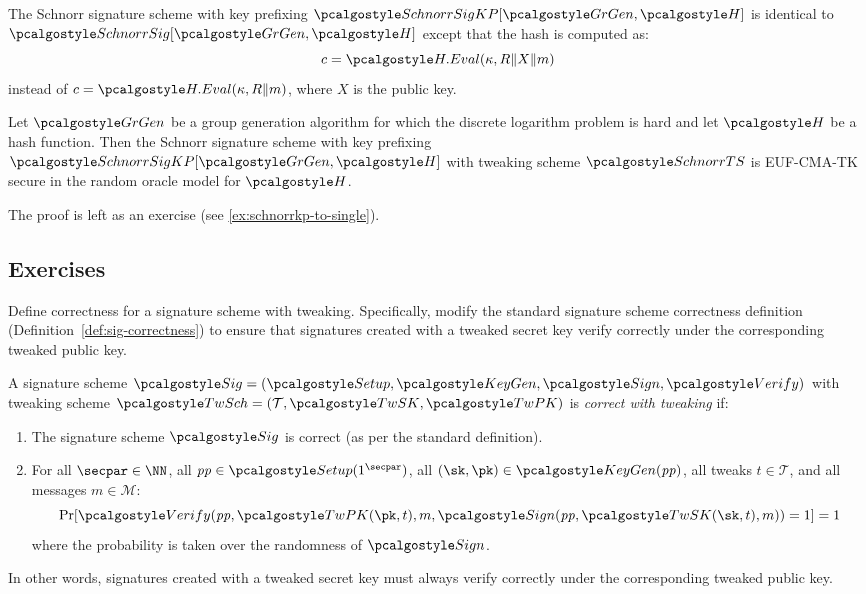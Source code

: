 \begin{definition}\label{def:schnorr-kp}
  The Schnorr signature scheme with key prefixing $\algo{SchnorrSigKP}[\grgen, \algo{H}]$ is identical to $\algo{SchnorrSig}[\grgen, \algo{H}]$ except that the hash is computed as:
  \[
    c = \algo{H.Eval}(\kappa, R \| X \| m)
  \]
  instead of $c = \algo{H.Eval}(\kappa, R \| m)$, where $X$ is the public key.
\end{definition}

\begin{theorem}\label{thm:schnorrkp-euf-cma-tk}
  Let $\grgen$ be a group generation algorithm for which the discrete logarithm problem is hard and let $\algo{H}$ be a hash function.
  Then the Schnorr signature scheme with key prefixing $\algo{SchnorrSigKP}[\grgen, \algo{H}]$ with tweaking scheme $\algo{SchnorrTS}$ is EUF-CMA-TK secure in the random oracle model for $\algo{H}$.
\end{theorem}

The proof is left as an exercise (see \autoref{ex:schnorrkp-to-single}).

\subsection{Exercises}

\begin{exercise}
  Define correctness for a signature scheme with tweaking.
  Specifically, modify the standard signature scheme correctness definition (Definition~\ref{def:sig-correctness}) to ensure that signatures created with a tweaked secret key verify correctly under the corresponding tweaked public key.
\end{exercise}

\ifsolutions
\begin{mysolution}
  A signature scheme $\algo{Sig} = (\algo{Setup}, \algo{KeyGen}, \algo{Sign}, \algo{Verify})$ with tweaking scheme $\algo{TwSch} = (\mathcal{T}, \algo{TwSK}, \algo{TwPK})$ is \emph{correct with tweaking} if:
  \begin{enumerate}
    \item The signature scheme $\algo{Sig}$ is correct (as per the standard definition).
    \item For all $\secpar \in \NN$, all $\params \in \algo{Setup}(1^\secpar)$, all $(\sk, \pk) \in \algo{KeyGen}(\params)$, all tweaks $t \in \mathcal{T}$, and all messages $m \in \mathcal{M}$:
    \[
      \Pr[\algo{Verify}(\params, \algo{TwPK}(\pk, t), m, \algo{Sign}(\params, \algo{TwSK}(\sk, t), m)) = 1] = 1
    \]
    where the probability is taken over the randomness of $\algo{Sign}$.
  \end{enumerate}
  
  In other words, signatures created with a tweaked secret key must always verify correctly under the corresponding tweaked public key.
\end{mysolution}
\fi

